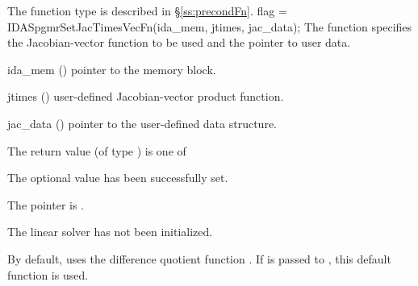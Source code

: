 {{   The function type  is described in \S\ref{ss:precondFn}.
}
{
  flag = IDASpgmrSetJacTimesVecFn(ida\_mem, jtimes, jac\_data);
}
{
  The function  specifies the Jacobian-vector 
  function to be used and the pointer to user data.
}
{
  \begin{args}
  \item[ida\_mem] ()
    pointer to the {\ida} memory block.
  \item[jtimes] ()
    user-defined Jacobian-vector product function.
  \item[jac\_data] ()
     pointer to the user-defined data structure.
  \end{args}
}
{
  The return value  (of type ) is one of
  \begin{args}
  \item[\Id{IDASPGMR\_SUCCESS}] 
    The optional value has been successfully set.
  \item[\Id{IDASPGMR\_MEM\_NULL}]
    The  pointer is .
  \item[\Id{IDASPGMR\_LMEM\_NULL}]
    The {\idaspgmr} linear solver has not been initialized.
  \end{args}
}
{
  By default, {\idaspgmr} uses the difference quotient function .
  If  is passed to , this default function is used.

}}
